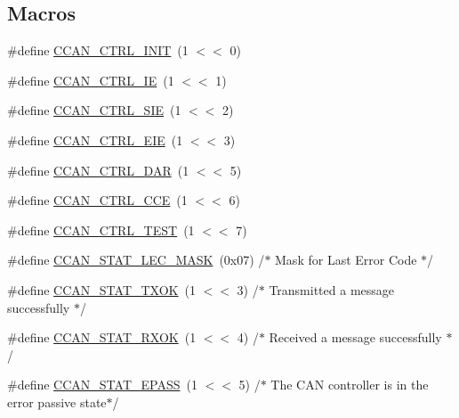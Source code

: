 \subsection*{Macros}
\begin{DoxyCompactItemize}
\item 
\#define \hyperlink{group___c_c_a_n__18_x_x__43_x_x_ga67343de48aecd561cc46691a58fe1aa2}{C\+C\+A\+N\+\_\+\+C\+T\+R\+L\+\_\+\+I\+N\+IT}~(1 $<$$<$ 0)
\item 
\#define \hyperlink{group___c_c_a_n__18_x_x__43_x_x_gaa4d20674c2eed8d630afd662d12fecc8}{C\+C\+A\+N\+\_\+\+C\+T\+R\+L\+\_\+\+IE}~(1 $<$$<$ 1)
\item 
\#define \hyperlink{group___c_c_a_n__18_x_x__43_x_x_gaa0de0b1c4b72f922d1e69d3849830928}{C\+C\+A\+N\+\_\+\+C\+T\+R\+L\+\_\+\+S\+IE}~(1 $<$$<$ 2)
\item 
\#define \hyperlink{group___c_c_a_n__18_x_x__43_x_x_ga7227d00cb5d6ab0055f183f272ee647c}{C\+C\+A\+N\+\_\+\+C\+T\+R\+L\+\_\+\+E\+IE}~(1 $<$$<$ 3)
\item 
\#define \hyperlink{group___c_c_a_n__18_x_x__43_x_x_ga372744b6be07f3fea89ada4ea3de4d9d}{C\+C\+A\+N\+\_\+\+C\+T\+R\+L\+\_\+\+D\+AR}~(1 $<$$<$ 5)
\item 
\#define \hyperlink{group___c_c_a_n__18_x_x__43_x_x_gaa65884720eb6b15b0acbff51e6be75b6}{C\+C\+A\+N\+\_\+\+C\+T\+R\+L\+\_\+\+C\+CE}~(1 $<$$<$ 6)
\item 
\#define \hyperlink{group___c_c_a_n__18_x_x__43_x_x_ga24b5503f3d90fa98a3ecb0e8f4e23bfa}{C\+C\+A\+N\+\_\+\+C\+T\+R\+L\+\_\+\+T\+E\+ST}~(1 $<$$<$ 7)
\item 
\#define \hyperlink{group___c_c_a_n__18_x_x__43_x_x_ga8ba9703a5b17eaefa9c4840455774a34}{C\+C\+A\+N\+\_\+\+S\+T\+A\+T\+\_\+\+L\+E\+C\+\_\+\+M\+A\+SK}~(0x07)		/$\ast$ Mask for Last Error Code $\ast$/
\item 
\#define \hyperlink{group___c_c_a_n__18_x_x__43_x_x_ga89b5bd7c2e8a0593d1d4b325e1d04a2f}{C\+C\+A\+N\+\_\+\+S\+T\+A\+T\+\_\+\+T\+X\+OK}~(1 $<$$<$ 3)	/$\ast$ Transmitted a message successfully $\ast$/
\item 
\#define \hyperlink{group___c_c_a_n__18_x_x__43_x_x_gad3b3105c74981a041f4d3515e989bfbd}{C\+C\+A\+N\+\_\+\+S\+T\+A\+T\+\_\+\+R\+X\+OK}~(1 $<$$<$ 4)	/$\ast$ Received a message successfully $\ast$/
\item 
\#define \hyperlink{group___c_c_a_n__18_x_x__43_x_x_ga86acb18cb4751429d866c9fb8f119d44}{C\+C\+A\+N\+\_\+\+S\+T\+A\+T\+\_\+\+E\+P\+A\+SS}~(1 $<$$<$ 5)	/$\ast$ The C\+AN controller is in the error passive state$\ast$/
\item 

\end{DoxyCompactItemize}
